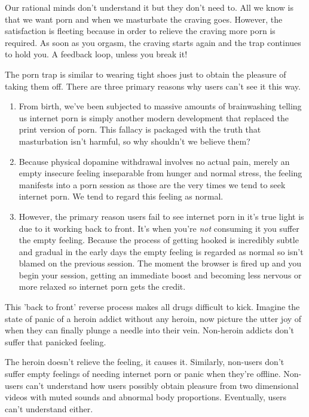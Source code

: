 \documentclass[easypeasy.tex]{subfiles}
\begin{document}
Our rational minds don't understand it but they don't need to. All we know is that we want porn and when we masturbate the craving goes. However, the satisfaction is fleeting because in order to relieve the craving more porn is required. As soon as you orgasm, the craving starts again and the trap continues to hold you. A feedback loop, unless you break it!

The porn trap is similar to wearing tight shoes just to obtain the pleasure of taking them off. There are three primary reasons why users can't see it this way.

\begin{enumerate}
  \item From birth, we've been subjected to massive amounts of brainwashing telling us internet porn is simply another modern development that replaced the print version of porn. This fallacy is packaged with the truth that masturbation isn't harmful, so why shouldn't we believe them?

  \item Because physical dopamine withdrawal involves no actual pain, merely an empty insecure feeling inseparable from hunger and normal stress, the feeling manifests into a porn session as those are the very times we tend to seek internet porn. We tend to regard this feeling as normal.

  \item However, the primary reason users fail to see internet porn in it's true light is due to it working back to front. It's when you're \textit{not} consuming it you suffer the empty feeling. Because the process of getting hooked is incredibly subtle and gradual in the early days the empty feeling is regarded as normal so isn't blamed on the previous session. The moment the browser is fired up and you begin your session, getting an immediate boost and becoming less nervous or more relaxed so internet porn gets the credit.
  \end{enumerate}

This 'back to front' reverse process makes all drugs difficult to kick. Imagine the state of panic of a heroin addict without any heroin, now picture the utter joy of when they can finally plunge a needle into their vein. Non-heroin addicts don't suffer that panicked feeling.

The heroin doesn't relieve the feeling, it causes it. Similarly, non-users don't suffer empty feelings of needing internet porn or panic when they're offline. Non-users can't understand how users possibly obtain pleasure from two dimensional videos with muted sounds and abnormal body proportions. Eventually, users can't understand either.
\end{document}
